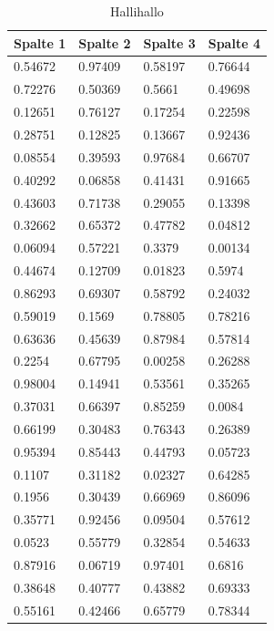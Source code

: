 \documentclass[12pt,ngerman,parskip=half]{scrreport}
\begin{document}
\begin{table}
\caption{Hallihallo}
\begin{center}
\begin{tabular}{llll} \toprule[2pt]
\textbf{Spalte 1}	&	\textbf{Spalte 2}	&	\textbf{Spalte 3}	&	\textbf{Spalte 4}	\\ \midrule[1.5pt]
0.54672	&	0.97409	&	0.58197	&	0.76644	\\
0.72276	&	0.50369	&	0.5661	&	0.49698	\\
0.12651	&	0.76127	&	0.17254	&	0.22598	\\
0.28751	&	0.12825	&	0.13667	&	0.92436	\\
0.08554	&	0.39593	&	0.97684	&	0.66707	\\
0.40292	&	0.06858	&	0.41431	&	0.91665	\\
0.43603	&	0.71738	&	0.29055	&	0.13398	\\
0.32662	&	0.65372	&	0.47782	&	0.04812	\\
0.06094	&	0.57221	&	0.3379	&	0.00134	\\
0.44674	&	0.12709	&	0.01823	&	0.5974	\\
0.86293	&	0.69307	&	0.58792	&	0.24032	\\
0.59019	&	0.1569	&	0.78805	&	0.78216	\\
0.63636	&	0.45639	&	0.87984	&	0.57814	\\
0.2254	&	0.67795	&	0.00258	&	0.26288	\\
0.98004	&	0.14941	&	0.53561	&	0.35265	\\
0.37031	&	0.66397	&	0.85259	&	0.0084	\\
0.66199	&	0.30483	&	0.76343	&	0.26389	\\
0.95394	&	0.85443	&	0.44793	&	0.05723	\\
0.1107	&	0.31182	&	0.02327	&	0.64285	\\
0.1956	&	0.30439	&	0.66969	&	0.86096	\\
0.35771	&	0.92456	&	0.09504	&	0.57612	\\
0.0523	&	0.55779	&	0.32854	&	0.54633	\\
0.87916	&	0.06719	&	0.97401	&	0.6816	\\
0.38648	&	0.40777	&	0.43882	&	0.69333	\\
0.55161	&	0.42466	&	0.65779	&	0.78344	\\ \bottomrule[2pt]
\end{tabular}
\end{center}
\end{table}
\end{document}
